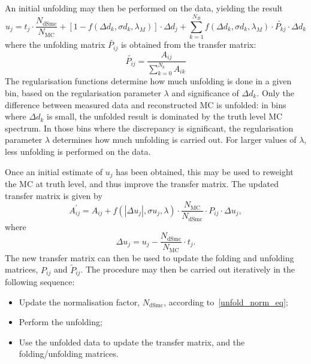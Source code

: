 An initial unfolding may then be performed on the data, yielding the result
\begin{equation}
u_j =  t_j \cdot \frac{N_{\mathrm{dSmc}}}{N_\mathrm{MC}} + \left [1 - f\left ( \Delta d_k, \sigma d_k, \lambda_M\right )\right ] \cdot \Delta d_j  + \sum_{k=1}^{N_B} f\left ( \Delta d_k, \sigma d_k, \lambda_M\right ) \cdot  \tilde{P_{kj}} \cdot \Delta d_k 
\label{unfold_unfolding_eq}
\end{equation}
where the unfolding matrix $\tilde{P_{ij}}$ is obtained from the transfer matrix:
\begin{equation}
\tilde{P_{ij}} = \frac{A_{ij}}{\sum_{k=0}^{N_b} A_{ik}}
\end{equation}
The regularisation functions determine how much unfolding is done in a given bin, based on the regularisation parameter $\lambda$ and significance of $\Delta d_k$. Only the difference between measured data and reconstructed MC is unfolded: in bins where $\Delta d_k$ is small, the unfolded result is dominated by the truth level MC spectrum. In those bins where the discrepancy is significant, the regularisation parameter $\lambda$ determines how much unfolding is carried out. For larger values of $\lambda$, less unfolding is performed on the data. 

Once an initial estimate of $u_j$ has been obtained, this may be used to reweight the MC at truth level, and thus improve the transfer matrix. The updated transfer matrix is given by
\begin{equation}
A^\prime_{ij} = A_{ij} + f(|\Delta u_j|, \sigma u_j, \lambda) \cdot \frac{N_\mathrm{MC}}{N_\mathrm{dSmc}} \cdot P_{ij} \cdot \Delta u_j, 
\end{equation}
where 
\begin{equation}
\Delta u_j = u_j - \frac{N_{\mathrm{dSmc}}}{N_\mathrm{MC}} \cdot t_{j}.
\end{equation}
 The new transfer matrix can then be used to update the folding and unfolding matrices, $P_{ij}$ and $\tilde{P}_{ij}$. The procedure may then be carried out iteratively in the following sequence:
\begin{itemize}
\item Update the normalisation factor, $N_\mathrm{dSmc}$, according to~\ref{unfold_norm_eq};
\item Perform the unfolding;
\item Use the unfolded data to update the transfer matrix, and the folding/unfolding matrices.
\end{itemize}


